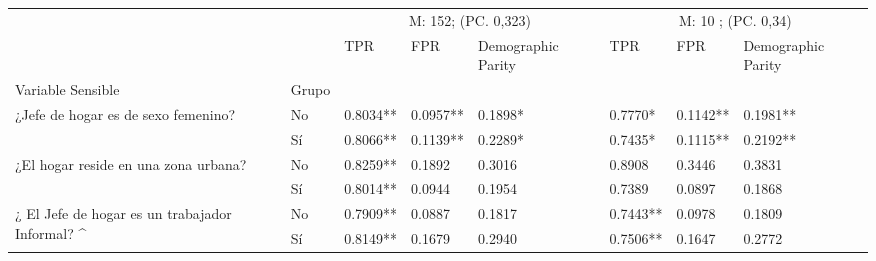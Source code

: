 \begin{tabular}{llllllll}
\toprule
 &  & \multicolumn{3}{c}{M: 152; (PC. 0,323)} & \multicolumn{3}{c}{M: 10 ; (PC. 0,34)} \\
\cmidrule(lr){3-5} \cmidrule(lr){6-8}
 &  & TPR & FPR & Demographic Parity & TPR & FPR & Demographic Parity \\
Variable Sensible & Grupo &  &  &  &  &  &  \\
\midrule
\multirow[t]{2}{*}{¿Jefe de hogar es 
de sexo femenino?} & No & 0.8034** & 0.0957** & 0.1898* & 0.7770* & 0.1142** & 0.1981** \\
 & Sí & 0.8066** & 0.1139** & 0.2289* & 0.7435* & 0.1115** & 0.2192** \\
\multirow[t]{2}{*}{¿El hogar reside en 
una zona urbana?} & No & 0.8259** & 0.1892 & 0.3016 & 0.8908 & 0.3446 & 0.3831 \\
 & Sí & 0.8014** & 0.0944 & 0.1954 & 0.7389 & 0.0897 & 0.1868 \\
\multirow[t]{2}{*}{¿ El Jefe de hogar 
es un trabajador Informal? ^} & No & 0.7909** & 0.0887 & 0.1817 & 0.7443** & 0.0978 & 0.1809 \\
 & Sí & 0.8149** & 0.1679 & 0.2940 & 0.7506** & 0.1647 & 0.2772 \\
\bottomrule
\end{tabular}
